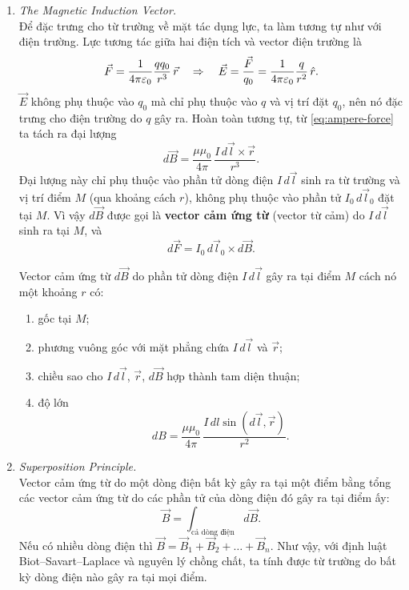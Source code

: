 \begin{enumerate}
\item \textit{The Magnetic Induction Vector.}\\
Để đặc trưng cho từ trường về mặt tác dụng lực, ta làm tương tự như với điện trường. Lực tương tác giữa hai điện tích và vector điện trường là
\[
\vec{F} = \frac{1}{4\pi\varepsilon_0}\frac{q q_0}{r^3}\,\vec{r}
\quad\Rightarrow\quad
\vec{E} = \frac{\vec{F}}{q_0} = \frac{1}{4\pi\varepsilon_0}\frac{q}{r^2}\,\hat{r}.
\]
$\vec{E}$ không phụ thuộc vào $q_0$ mà chỉ phụ thuộc vào $q$ và vị trí đặt $q_0$, nên nó đặc trưng cho điện trường do $q$ gây ra. Hoàn toàn tương tự, từ \cref{eq:ampere-force} ta tách ra đại lượng
\begin{equation}\label{eq:bsl}
d\vec{B} = \frac{\mu\mu_0}{4\pi}\,\frac{I\,d\vec{l} \times \vec{r}}{r^3}.
\end{equation}
Đại lượng này chỉ phụ thuộc vào phần tử dòng điện $I\,d\vec{l}$ sinh ra từ trường và vị trí điểm $M$ (qua khoảng cách $r$), không phụ thuộc vào phần tử $I_0\,d\vec{l}_0$ đặt tại $M$. Vì vậy $d\vec{B}$ được gọi là \textbf{vector cảm ứng từ} (vector từ cảm) do $I\,d\vec{l}$ sinh ra tại $M$, và
\[
d\vec{F} = I_0\,d\vec{l}_0 \times d\vec{B}.
\]

\begin{theorem}
Vector cảm ứng từ $d\vec{B}$ do phần tử dòng điện $I\,d\vec{l}$ gây ra tại điểm $M$ cách nó một khoảng $r$ có:
\begin{enumerate}
  \item[(a)] gốc tại $M$;
  \item[(b)] phương vuông góc với mặt phẳng chứa $I\,d\vec{l}$ và $\vec{r}$;
  \item[(c)] chiều sao cho $I\,d\vec{l}$, $\vec{r}$, $d\vec{B}$ hợp thành tam diện thuận;
  \item[(d)] độ lớn
  \[
  dB = \frac{\mu\mu_0}{4\pi}\,\frac{I\,dl\sin(d\vec{l},\vec{r})}{r^2}.
  \]
\end{enumerate}
\end{theorem}

\item \textit{Superposition Principle.}\\
Vector cảm ứng từ do một dòng điện bất kỳ gây ra tại một điểm bằng tổng các vector cảm ứng từ do các phần tử của dòng điện đó gây ra tại điểm ấy:
\[
\vec{B} = \int_{\text{cả dòng điện}} d\vec{B}.
\]
Nếu có nhiều dòng điện thì $\vec{B} = \vec{B}_1 + \vec{B}_2 + \dots + \vec{B}_n$. Như vậy, với định luật Biot--Savart--Laplace và nguyên lý chồng chất, ta tính được từ trường do bất kỳ dòng điện nào gây ra tại mọi điểm.


\end{enumerate}
